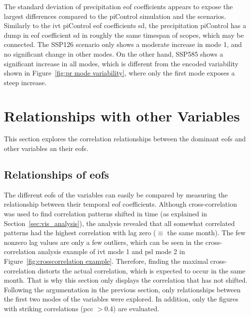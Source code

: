 The standard deviation of precipitation \ac{eof} coefficients appears to expose the largest differences compared to the piControl simulation and the scenarios. 
Similarly to the \ac{ivt} piControl \ac{eof} coefficients \ac{sd}, the precipitation piControl has a dump in \ac{eof} coefficient \ac{sd} in roughly the same timespan of scopes, which may be connected. 
The SSP126 scenario only shows a moderate increase in mode 1, and no significant change in other modes. 
On the other hand, SSP585 shows a significant increase in all modes, which is different from the encoded variability shown in Figure~\ref{fig:pr mode variability}, where only the first mode exposes a steep increase. 


\section{Relationships with other Variables}

This section explores the correlation relationships between the dominant \acp{eof} and other variables an their \acp{eof}. 

\subsection{Relationships of \acp{eof}}

The different \acp{eof} of the variables can easily be compared by measuring the relationship between their temporal \ac{eof} coefficients. 
Although cross-correlation was used to find correlation patterns shifted in time (as explained in Section~\ref{sec:vis_analysis}), the analysis revealed that all somewhat correlated patterns had the highest correlation with lag zero ($\equiv$ the same month). 
The few nonzero lag values are only a few outliers, which can be seen in the cross-correlation analysis example of  \ac{ivt} mode 1 and \ac{psl} mode 2 in Figure~\ref{fig:crosscorrelation example}.
Therefore, finding the maximal cross-correlation distorts the actual correlation, which is expected to occur in the same month. 
That is why this section only displays the correlation that has not shifted.
Following the argumentation in the previous section, only relationships between the first two modes of the variables were explored. 
In addition, only the figures with striking correlations (\acf{pcc} $> 0.4$) are evaluated. 

